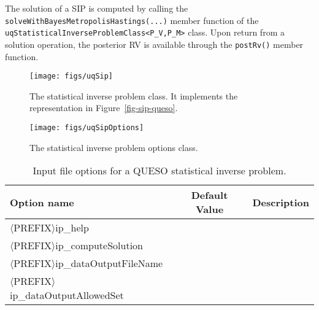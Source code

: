 The solution of a SIP is computed by calling the \verb+solveWithBayesMetropolisHastings(...)+ member function of the \verb+uqStatisticalInverseProblemClass<P_V,P_M>+ class.
Upon return from a solution operation, the posterior RV is available through the \verb+postRv()+ member function.


\begin{figure}[htp!]
\centering
\texttt{[image: figs/uqSip]}
\vspace{-8pt}
\caption{The statistical inverse problem class. It implements the representation in Figure~\ref{fig-sip-queso}.}
\label{fig-sip-class}
\end{figure}

\begin{figure}[htp!]
\centering
\texttt{[image: figs/uqSipOptions]}
\vspace{-8pt}
\caption{The statistical inverse problem options class.}
\label{fig-sip-options-class}
\end{figure}

\begin{table}[htpb]
\begin{center}
\caption{Input file options for a QUESO statistical inverse problem.}
\ttfamily

\begin{tabular}{l|c|c}
\toprule
\rmfamily Option name                    & \rmfamily Default  Value & \rmfamily Description \\
\midrule\midrule
$\langle$PREFIX$\rangle$ip\_help                 &         &             \\

$\langle$PREFIX$\rangle$ip\_computeSolution      &         &             \\

$\langle$PREFIX$\rangle$ip\_dataOutputFileName   &         &             \\

$\langle$PREFIX$\rangle$ip\_dataOutputAllowedSet &         &             \\
\bottomrule
\end{tabular}
\end{center}

\label{tab-sip-options}
\end{table}



